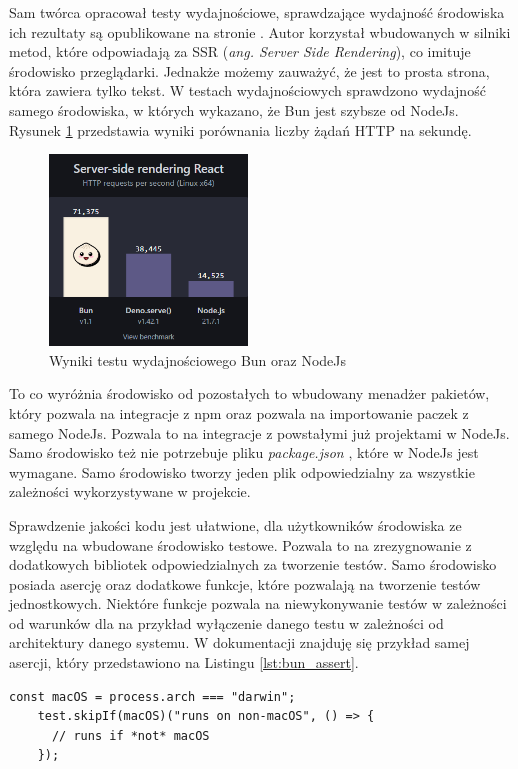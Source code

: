 Sam twórca opracował testy wydajnościowe, sprawdzające wydajność środowiska ich rezultaty są opublikowane na stronie \cite{bun_test}. Autor korzystał wbudowanych w silniki metod, które odpowiadają za SSR (\textit{ang. Server Side Rendering}), co imituje środowisko przeglądarki. Jednakże możemy zauważyć, że jest to prosta strona, która zawiera tylko tekst. W testach wydajnościowych sprawdzono wydajność samego środowiska, w których wykazano, że Bun jest szybsze od NodeJs. Rysunek \ref{fig:bun_bench} przedstawia wyniki porównania liczby żądań HTTP na sekundę.

\begin{figure}[H]
  \centering
  \includegraphics[width=0.47\textwidth]{Figures/bun_bench.png}
  \caption{Wyniki testu wydajnościowego Bun oraz NodeJs \cite{bun_test}}
  \label{fig:bun_bench}
\end{figure}

To co wyróżnia środowisko od pozostałych to wbudowany menadżer pakietów, który pozwala na integracje z npm \cite{npm} oraz pozwala na importowanie paczek z samego NodeJs. Pozwala to na integracje z powstałymi już projektami w NodeJs. Samo środowisko też nie potrzebuje pliku \textit{package.json} \cite{package_structure}, które w NodeJs jest wymagane. Samo środowisko tworzy jeden plik odpowiedzialny za wszystkie zależności wykorzystywane w projekcie.

Sprawdzenie jakości kodu jest ułatwione, dla użytkowników środowiska ze względu na wbudowane środowisko testowe. Pozwala to na zrezygnowanie z dodatkowych bibliotek odpowiedzialnych za tworzenie testów. Samo środowisko posiada asercję oraz dodatkowe funkcje, które pozwalają na tworzenie testów jednostkowych. Niektóre funkcje pozwala na niewykonywanie testów w zależności od warunków dla na przykład wyłączenie danego testu w zależności od architektury danego systemu. W dokumentacji znajduję się przykład samej asercji, który przedstawiono na Listingu \ref{lst:bun_assert}.

\begin{centering}
  \begin{lstlisting}[caption={Przykład asercji w środowisku Bun}, label={lst:bun_assert} ]
    const macOS = process.arch === "darwin";
    test.skipIf(macOS)("runs on non-macOS", () => {
      // runs if *not* macOS
    });
  \end{lstlisting}
\end{centering}


